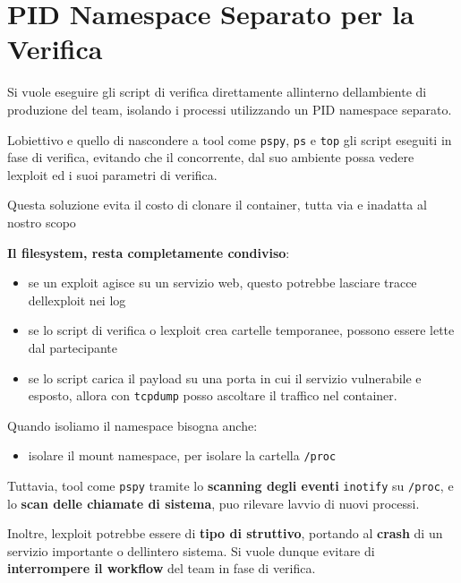 \section{PID Namespace Separato per la
Verifica}\label{pid-namespace-separato-per-la-verifica}

Si vuole eseguire gli script di verifica direttamente
all\textquotesingle interno dell\textquotesingle ambiente di produzione
del team, isolando i processi utilizzando un PID namespace separato.

L\textquotesingle obiettivo e\textquotesingle{} quello di nascondere a
tool come \passthrough{\lstinline!pspy!}, \passthrough{\lstinline!ps!} e
\passthrough{\lstinline!top!} gli script eseguiti in fase di verifica,
evitando che il concorrente, dal suo ambiente possa vedere
l\textquotesingle exploit ed i suoi parametri di verifica.

Questa soluzione evita il costo di clonare il container, tutta via
e\textquotesingle{} inadatta al nostro scopo

\textbf{Il filesystem, resta completamente condiviso}:

\begin{itemize}
\tightlist
\item
  se un exploit agisce su un servizio web, questo potrebbe lasciare
  tracce dell\textquotesingle exploit nei log
\item
  se lo script di verifica o l\textquotesingle exploit crea cartelle
  temporanee, possono essere lette dal partecipante
\item
  se lo script carica il payload su una porta in cui il servizio
  vulnerabile e\textquotesingle{} esposto, allora con
  \passthrough{\lstinline!tcpdump!} posso ascoltare il traffico nel
  container.
\end{itemize}

Quando isoliamo il namespace bisogna anche:

\begin{itemize}
\tightlist
\item
  isolare il mount namespace, per isolare la cartella
  \passthrough{\lstinline!/proc!}
\end{itemize}

Tuttavia, tool come \passthrough{\lstinline!pspy!} tramite lo
\textbf{scanning degli eventi} \passthrough{\lstinline!inotify!} su
\passthrough{\lstinline!/proc!}, e lo \textbf{scan delle chiamate di
sistema}, puo\textquotesingle{} rilevare l\textquotesingle avvio di
nuovi processi.

Inoltre, l\textquotesingle exploit potrebbe essere di \textbf{tipo di
struttivo}, portando al \textbf{crash} di un servizio importante o
dell\textquotesingle intero sistema. Si vuole dunque evitare di
\textbf{interrompere il workflow} del team in fase di verifica.

